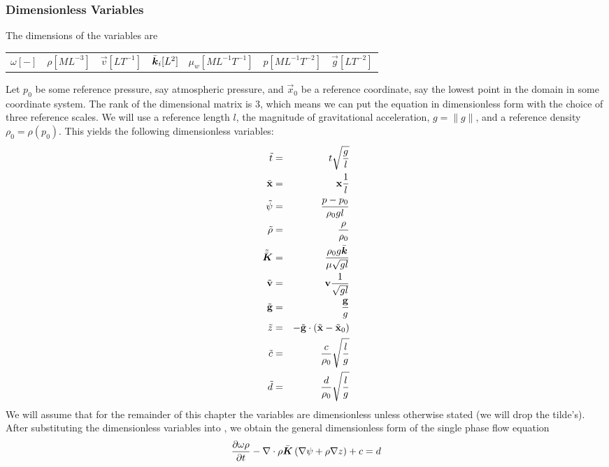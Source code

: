 \documentclass[10pt,dvips,twoside,reqno]{amsart}
\begin{document}
\subsubsection{Dimensionless Variables \label{onePhaseDimensionless}}
The dimensions of the variables are
\begin{center}
\begin{tabular}{ccccccc}
$\omega [-]$ & $\rho [ML^{-3}]$ & $\vec v [LT^{-1}]$ & $\bar{\mbox{{\boldmath ${k}$}}}_i [L^2]$ & $\mu_w [ML^{-1}T^{-1}]$ &$p [ML^{-1}T^{-2}]$&$\vec g [LT^{-2}]$
\end{tabular}
\end{center}
Let $p_0$ be some reference pressure, say atmospheric pressure, and
$\vec x_0$ be a reference coordinate, say the lowest point in the
domain in some coordinate system. The rank of the dimensional matrix
is 3, which means we can put the equation in dimensionless form with
the choice of three reference scales. We will use a reference length
$l$, the magnitude of gravitational acceleration, $g = \| g\|$, and a
reference density $\rho_0 = \rho(p_0)$. This yields the following
dimensionless variables:
\begin{eqnarray}
\tilde{t} &=& t \sqrt{\frac{g}{l}} \\
\tilde{{\bf x}} &=& {\bf x} \frac{1}{l} \\
\tilde{\psi} &=& \frac{p - p_0}{\rho_0 g l} \label{eq:head}\\
\tilde{\rho} &=& \frac{\rho}{\rho_0} \\
\tilde{\bar{\mbox{{\boldmath ${K}$}}}} &=& \frac{\rho_0 g \bar{\mbox{{\boldmath ${k}$}}}}{\mu \sqrt{gl}} \\
\tilde{{\bf v}} &=& {\bf v} \frac{1}{\sqrt{gl}} \\
\tilde{{\bf g}} &=& \frac{{\bf g}}{g} \label{eq:dg} \\
\tilde{z} &=& -\tilde{{\bf g}} \cdot (\tilde{{\bf x}} - \tilde{{\bf x}}_0) \\
\tilde{c} &=& \frac{c}{\rho_0}\sqrt{\frac{l}{g}} \\ 
\tilde{d} &=& \frac{d}{\rho_0}\sqrt{\frac{l}{g}} \\ 
\end{eqnarray}
We will assume that for the remainder of this chapter the variables
are dimensionless unless otherwise stated (we will drop the
tilde's).  After substituting the dimensionless variables into
, we obtain the general dimensionless
form of the single phase flow equation
\begin{equation}
  \label{eq:satFlowDimensionless}
  \frac{\partial {\omega \rho}}{\partial {t}} - \nabla \cdot \rho \bar{\mbox{{\boldmath ${K}$}}} \left( \nabla \psi + \rho \nabla z \right) + c = d 
\end{equation}
\end{document}
